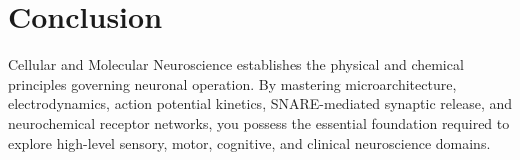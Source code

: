 \documentclass[10pt,journal,compsoc,onecolumn]{IEEEtran}
\begin{document}
\section{Conclusion}
\label{sec:conclusion}

Cellular and Molecular Neuroscience establishes the physical and chemical principles governing neuronal operation. By mastering microarchitecture, electrodynamics, action potential kinetics, SNARE-mediated synaptic release, and neurochemical receptor networks, you possess the essential foundation required to explore high-level sensory, motor, cognitive, and clinical neuroscience domains.
\end{document}
